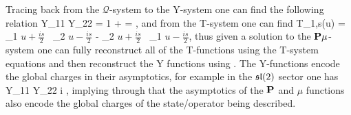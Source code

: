 Tracing back from the $\mathcal{Q}$-system to the Y-system one can find the following relation
\beq
	\label{eq:y_asymp}
	Y_{11} Y_{22} = 1 +  = ,
\eeq
and from the T-system one can find
\beq
	T_{1,s}(u) = \bP_1 \(u+\frac{is}{2}\) \, \bP_2 \(u-\frac{is}{2}\) - \bP_2 \(u+\frac{is}{2}\) \, \bP_1 \(u-\frac{is}{2}\),
\eeq
thus given a solution to the ${\bf P}\mu$-system one can fully reconstruct all of the T-functions using the T-system equations  and then reconstruct the Y functions using .
The Y-functions encode the global charges in their asymptotics, for example in the $\mathfrak{sl}(2)$ sector one has \cite{Gromov:2011cx} 
\beq
	\label{eq:y1122_sl2_asymptotics}
	\log Y_{11} Y_{22} \; \simeq \; i ,
\eeq
implying through  that the asymptotics of the ${\bf P}$ and $\mu$ functions also encode the global charges of the state/operator being described.

